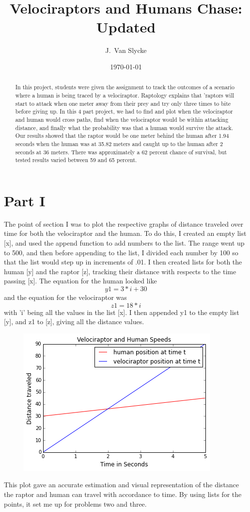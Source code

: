 \documentclass[twocolumn]{revtex4}
\begin{document}
\title{
Velociraptors and Humans Chase: Updated
}

\author{J.~Van Slycke}
\date{\today}

\begin{abstract}
  
    In this project, students were given the assignment to track the outcomes of a scenario where a human is being traced by a velociraptor. Raptology explains that 'raptors will start to attack when one meter away from their prey and try only three times to bite before giving up. In this 4 part project, we had to find and plot when the velociraptor and human would cross paths, find when the velociraptor would be within attacking distance, and finally what the probability was that a human would survive the attack. Our results showed that the raptor would be one meter behind the human after 1.94 seconds when the human was at 35.82 meters and caught up to the human after 2 seconds at 36 meters. There was approximately a 62 percent chance of survival, but tested results varied between 59 and 65 percent. 
\end{abstract}

\maketitle
     
	\section{Part I}

	The point of section I was to plot the respective graphs of distance traveled over time for both the velociraptor and the human. To do this, I created an empty list [x], and used the append function to add numbers to the list. The range went up to 500, and then before appending to the list, I divided each number by 100 so that the list would step up in increments of .01. I then created lists for both the human [y] and the raptor [z], tracking their distance with respects to the time passing [x]. The equation for the human looked like $$y1=3*i +30$$ and the equation for the velociraptor was $$z1=18*i$$with 'i' being all the values in the list [x]. I then appended y1 to the empty list [y], and z1 to [z], giving all the distance values.
	
	\begin{figure}[h]
		\centering 
		\includegraphics[width=.4\textwidth]{1_plot}
	\end{figure}
	This plot gave an accurate estimation and visual representation of the distance the raptor and human can travel with accordance to time. By using lists for the points, it set me up for problems two and three.
\end{document}
